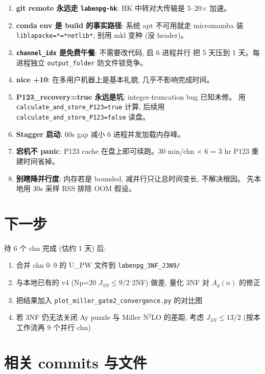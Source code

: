\documentclass[11pt,a4paper]{article}
\begin{document}
\begin{enumerate}[itemsep=2pt]
\item \textbf{git remote 永远走 \texttt{labenpg-hk}}: HK 中转对大传输是 5--20$\times$ 加速。
\item \textbf{conda env 是 build 的事实路径}: 系统 apt 不可用就走 micromamba 装
      \texttt{liblapacke=*=*netlib*}; 别用 mkl 变种 (没 header)。
\item \textbf{\texttt{channel\_idx} 是免费午餐}: 不需要改代码, 启 6 进程并行
      把 5 天压到 1 天。每进程独立 \texttt{output\_folder} 防文件锁竞争。
\item \textbf{nice +10}: 在多用户机器上是基本礼貌, 几乎不影响完成时间。
\item \textbf{P123\_recovery=true 永远是坑}: integer-truncation bug 已知未修。
      用 \texttt{calculate\_and\_store\_P123=true} 计算, 后续用
      \texttt{calculate\_and\_store\_P123=false} 读盘。
\item \textbf{Stagger 启动}: 60s gap 减小 6 进程并发加载内存峰。
\item \textbf{宕机不 panic}: P123 cache 在盘上即可续跑。30 min/chn $\times$ 6 = 3 hr
      P123 重建时间省掉。
\item \textbf{别瞎降并行度}: 内存若是 bounded, 减并行只让总时间变长, 不解决根因。
      先本地用 30s 采样 RSS 排除 OOM 假设。
\end{enumerate}

\section{下一步}

待 6 个 chn 完成 (估约 1 天) 后:

\begin{enumerate}[itemsep=2pt]
\item 合并 chn 0--9 的 U\_PW 文件到 \texttt{labenpg\_3NF\_J3N9/}
\item 与本地已有的 v4 (Np=20 $J_{3N}\le 9/2$ 2NF) 做差, 量化 3NF 对 $A_y(n)$ 的修正
\item 把结果加入 \texttt{plot\_miller\_gate2\_convergence.py} 的对比图
\item 若 3NF 仍无法关闭 Ay puzzle 与 Miller N$^2$LO 的差距, 考虑
      $J_{3N}\le 13/2$ (按本工作流再 9 个并行 chn)
\end{enumerate}

\appendix
\section{相关 commits 与文件}
\end{document}
